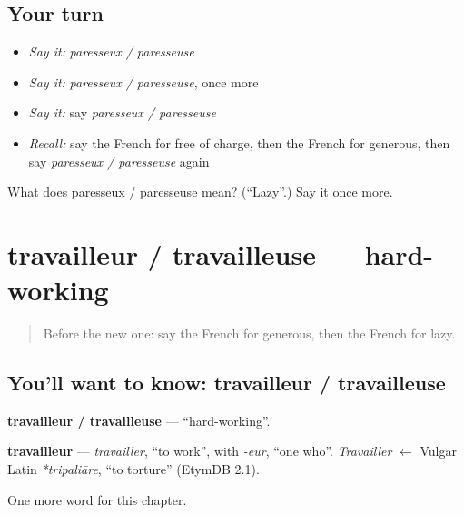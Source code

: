 \subsection*{Your turn}
\begin{itemize}
\raggedright
  \item \emph{Say it:} \emph{paresseux / paresseuse}
  \item \emph{Say it:} \emph{paresseux / paresseuse}, once more
  \item \emph{Say it:} say \emph{paresseux / paresseuse}
  \item \emph{Recall:} say the French for free of charge, then the French for generous, then say \emph{paresseux / paresseuse} again
\end{itemize}

\begin{tcolorbox}[breakable,colback=teal!4,colframe=teal!35!black,title={Before you move on}]
What does paresseux / paresseuse mean? (\textquotedblleft{}Lazy\textquotedblright{}.) Say it once more.
\end{tcolorbox}
\section[travailleur / travailleuse]{travailleur / travailleuse — hard-working}

\label{lesson:FR-C246-travailleur-travailleuse}



\begin{quote}
Before the new one: say the French for generous, then the French for lazy.
\end{quote}

\subsection*{You'll want to know: travailleur / travailleuse}
\textbf{travailleur / travailleuse} — \textquotedblleft{}hard-working\textquotedblright{}.

\begin{cousinweb}
\textbf{travailleur} — \emph{travailler}, \textquotedblleft{}to work\textquotedblright{}, with \emph{-eur}, \textquotedblleft{}one who\textquotedblright{}. \emph{Travailler} $\leftarrow$ Vulgar Latin \emph{*tripaliāre}, \textquotedblleft{}to torture\textquotedblright{} (EtymDB 2.1).
\end{cousinweb}

\begin{grammarlens}[title={What you've built}]
One more word for this chapter.
\end{grammarlens}

